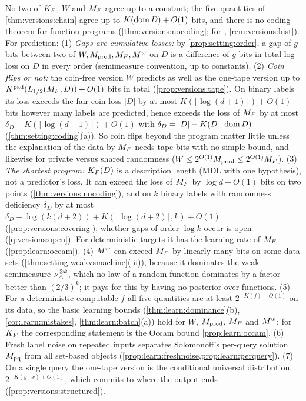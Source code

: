 \begin{remark}\label{rem:versions:answer}\label{rem:versions:prediction}
No two of $K_{F}$, $W$ and $M_{F}$ agree up to a constant; the five quantities of \cref{thm:versions:chain} agree up to $K(\operatorname{dom} D)+O(1)$ bits, and there is no coding theorem for function programs (\cref{thm:versions:nocoding}; for \SFIhist{}, \cref{rem:versions:hist}). For prediction:
(1) \emph{Gaps are cumulative losses:} by \cref{prop:setting:order}, a gap of $g$ bits between two of $W,M_{\mathrm{prod}},M_{F},M^{w}$ on $D$ is a difference of $g$ bits in total log loss on $D$ in every order (semimeasure convention, up to constants).
(2) \emph{Coin flips or not:} the coin-free version $W$ predicts as well as the one-tape version up to $K^{\mathrm{pad}}(L_{1/2}(M_{F},D))+O(1)$ bits in total (\cref{prop:versions:tape}). On binary labels its loss exceeds the fair-coin loss $|D|$ by at most $K(\lceil\log(d+1)\rceil)+O(1)$ bits however many labels are predicted, hence exceeds the loss of $M_{F}$ by at most $\delta_D+K(\lceil\log(d+1)\rceil)+O(1)$ with $\delta_D=|D|-K(D\mid\operatorname{dom} D)$ (\cref{thm:setting:coding}(a)). So coin flips beyond the program matter little unless the explanation of the data by $M_{F}$ needs tape bits with no simple bound, and likewise for private versus shared randomness ($W\le2^{O(1)}M_{\mathrm{prod}}\le2^{O(1)}M_{F}$).
(3) \emph{The shortest program:} $K_{F}(D)$ is a description length (MDL with one hypothesis), not a predictor's loss. It can exceed the loss of $M_{F}$ by $\log d-O(1)$ bits on two points (\cref{thm:versions:nocoding}), and on $k$ binary labels with randomness deficiency $\delta_D$ by at most $\delta_D+\log(k(d+2))+K(\lceil\log(d+2)\rceil,k)+O(1)$ (\cref{prop:versions:covering}); whether gaps of order $\log k$ occur is open (\cref{q:versions:open}). For deterministic targets it has the learning rate of $M_{F}$ (\cref{prop:learn:occam}).
(4) $M^{w}$ can exceed $M_{F}$ by linearly many bits on some data sets (\cref{thm:setting:weakvsmachine}(iii)), because it dominates the weak semimeasure $\nu_{\triangle}^{\otimes k}$, which no law of a random function dominates by a factor better than $(2/3)^k$; it pays for this by having no posterior over functions.
(5) For a deterministic computable $f$ all five quantities are at least $2^{-K(f)-O(1)}$ on its data, so the basic learning bounds (\cref{thm:learn:dominance}(b), \cref{cor:learn:mistakes}, \cref{thm:learn:batch}(a)) hold for $W$, $M_{\mathrm{prod}}$, $M_{F}$ and $M^{w}$; for $K_{F}$ the corresponding statement is the Occam bound \cref{prop:learn:occam}.
(6) Fresh label noise on repeated inputs separates Solomonoff's per-query solution $M_{\mathrm{pq}}$ from all set-based objects (\cref{prop:learn:freshnoise,prop:learn:perquery}).
(7) On a single query the one-tape version is the conditional universal distribution, $2^{-K(y\mid x)\pm O(1)}$, which commits to where the output ends (\cref{prop:versions:structured}).
\end{remark}

